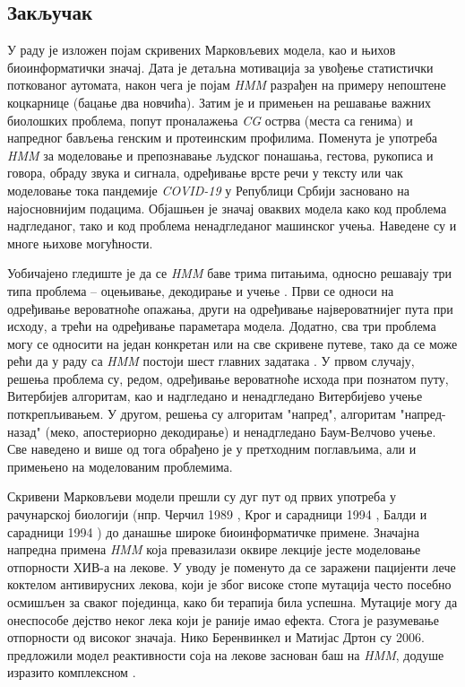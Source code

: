 \documentclass[12pt,oneside]{memoir}
\begin{document}
\begin{CJK}{UTF8}{ipxm}
\chapter{Закључак}
У раду је изложен појам скривених Марковљевих модела, као и њихов биоинформатички значај. Дата је детаљна мотивација за увођење статистички поткованог аутомата, након чега је појам \textit{HMM} разрађен на примеру непоштене коцкарнице (бацање два новчића). Затим је и примењен на решавање важних биолошких проблема, попут проналажења \textit{CG} острва (места са генима) и напредног бављења генским и протеинским профилима. Поменута је употреба \textit{HMM} за моделовање и препознавање људског понашања, гестова, рукописа и говора, обраду звука и сигнала, одређивање врсте речи у тексту или чак моделовање тока пандемије \textit{COVID-19} у Републици Србији засновано на најосновнијим подацима. Објашњен је значај оваквих модела како код проблема надгледаног, тако и код проблема ненадгледаног машинског учења. Наведене су и многе њихове могућности.

Уобичајено гледиште је да се \textit{HMM} баве трима питањима, односно решавају три типа проблема -- оцењивање, декодирање и учење \cite{rabiner1989}. Први се односи на одређивање вероватноће опажања, други на одређивање највероватнијег пута при исходу, а трећи на одређивање параметара модела. Додатно, сва три проблема могу се односити на један конкретан или на све скривене путеве, тако да се може рећи да у раду са \textit{HMM} постоји шест главних задатака \cite{kelliss2021}. У првом случају, решења проблема су, редом, одређивање вероватноће исхода при познатом путу, Витербијев алгоритам, као и надгледано и ненадгледано Витербијево учење поткрепљивањем. У другом, решења су алгоритам "напред", алгоритам "напред-назад" (меко, апостериорно декодирање) и ненадгледано Баум-Велчово учење. Све наведено и више од тога обрађено је у претходним поглављима, али и примењено на моделованим проблемима.

Скривени Марковљеви модели прешли су дуг пут од првих употреба у рачунарској биологији (нпр. Черчил 1989 \cite{churchill1989}, Крог и сарадници 1994 \cite{krogh1994}, Балди и сарадници 1994 \cite{baldi1994}) до данашње широке биоинформатичке примене. Значајна напредна примена \textit{HMM} која превазилази оквире лекције јесте моделовање отпорности ХИВ-а на лекове. У уводу је поменуто да се заражени пацијенти лече коктелом антивирусних лекова, који је због високе стопе мутација често посебно осмишљен за сваког појединца, како би терапија била успешна. Мутације могу да онеспособе дејство неког лека који је раније имао ефекта. Стога је разумевање отпорности од високог значаја. Нико Беренвинкел и Матијас Дртон су 2006. предложили модел реактивности соја на лекове заснован баш на \textit{HMM}, додуше изразито комплексном \cite{beerenwinkel2007}.


\end{CJK}
\end{document}

